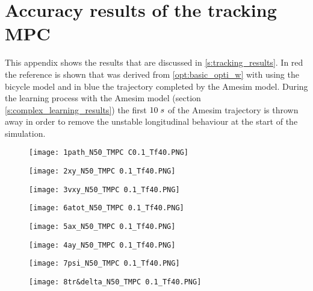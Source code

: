 \chapter{Accuracy results of the tracking MPC}
\label{app:D}
This appendix shows the results that are discussed in \ref{s:tracking_results}. In red the reference is shown that was derived from \ref{opt:basic_opti_w} with using the bicycle model and in blue the trajectory completed by the Amesim model. During the learning process with the Amesim model (section \ref{s:complex_learning_results}) the first $10 \hspace{1mm}s$ of the Amesim trajectory is thrown away in order to remove the unstable longitudinal behaviour at the start of the simulation.


\begin{figure}[h!]
	\centering
	\texttt{[image: 1path\_N50\_TMPC C0.1\_Tf40.PNG]}
\end{figure}

\begin{figure}[h!]
	\centering
	\texttt{[image: 2xy\_N50\_TMPC 0.1\_Tf40.PNG]}
\end{figure}

\begin{figure}[h!]
	\centering
	\texttt{[image: 3vxy\_N50\_TMPC 0.1\_Tf40.PNG]}
\end{figure}


\begin{figure}[h!]
	\centering
	\texttt{[image: 6atot\_N50\_TMPC 0.1\_Tf40.PNG]}
\end{figure}


\begin{figure}[h!]
	\centering
	\texttt{[image: 5ax\_N50\_TMPC 0.1\_Tf40.PNG]}
\end{figure}

\begin{figure}[h!]
	\centering
	\texttt{[image: 4ay\_N50\_TMPC 0.1\_Tf40.PNG]}
\end{figure}

\begin{figure}[h!]
	\centering
	\texttt{[image: 7psi\_N50\_TMPC 0.1\_Tf40.PNG]}
\end{figure}

\begin{figure}[h!]
	\centering
	\texttt{[image: 8tr\&delta\_N50\_TMPC 0.1\_Tf40.PNG]}
\end{figure}

